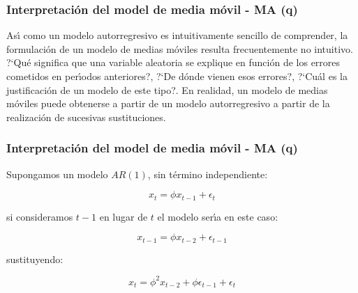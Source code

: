 \subsubsection[1]{Interpretaci\'on del model de media m\'ovil - MA (q)}

As\'{\i} como un modelo autorregresivo es intuitivamente sencillo de comprender, la formulaci\'on de un modelo de medias m\'oviles resulta frecuentemente no intuitivo. ?`Qu\'e significa que una variable aleatoria se explique en funci\'on de los errores cometidos en per\'{\i}odos anteriores?, ?`De d\'onde vienen esos errores?, ?`Cu\'al es la justificaci\'on de un modelo de este tipo?.
En realidad, un modelo de medias m\'oviles puede obtenerse a partir de un modelo autorregresivo a partir de la realizaci\'on de sucesivas sustituciones.



\subsubsection[2]{Interpretaci\'on del model de media m\'ovil - MA (q)}
Supongamos un modelo $AR(1)$, sin t\'ermino independiente:

\begin{equation}
x_t =  \phi x_{t-1} + \epsilon_t
\end{equation}

si consideramos $t-1$ en lugar de $t$ el modelo ser\'{\i}a en este caso:

\begin{equation}
x_{t-1} =  \phi x_{t-2} + \epsilon_{t-1}
\end{equation}

sustituyendo:

\begin{equation}
x_t =  \phi^2 x_{t-2} + \phi \epsilon_{t-1} + \epsilon_t
\end{equation}


%

